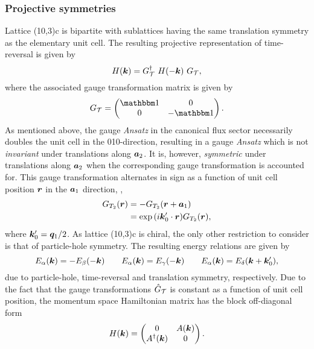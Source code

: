 %
%
\subsubsection{Projective symmetries}
%
%
Lattice (10,3)c is bipartite with sublattices having the same translation symmetry as the elementary unit cell.
The resulting projective representation of time-reversal is given by
%
\begin{equation}
	H(\bm{k}) = G^{\dagger}_{\mathcal{T}}~H(-\bm{k})~G_{\mathcal{T}},
\end{equation}
%
where the associated gauge transformation matrix is given by
%
\begin{equation}
	G_{\mathcal{T}} =
		\begin{pmatrix}
			\id & 0 \\
			0	& -\id
		\end{pmatrix}.
\end{equation}
%
As mentioned above, the gauge \textit{Ansatz} in the canonical flux sector necessarily doubles the unit cell in the 010-direction, resulting in a gauge \textit{Ansatz} which is not \textit{invariant} under translations along $\bm{a}_2$.
It is, however, \textit{symmetric} under translations along $\bm{a}_2$ when the corresponding gauge transformation is accounted for.
This gauge transformation alternates in sign as a function of unit cell position $\bm{r}$ in the $\bm{a}_1$ direction, \ie,
\begin{align}
	G_{T_2}(\bm{r}) &= -G_{T_2}(\bm{r} + \bm{a}_1) \nonumber\\
				 &= \exp{(i \bm{k}'_0 \cdot \bm{r})} G_{T_2}(\bm{r}),
\end{align}
where $\bm{k}'_0 = \bm{q}_1 / 2$.
As lattice (10,3)c is chiral, the only other restriction to consider is that of particle-hole symmetry.
The resulting energy relations are given by
%
\begin{equation}
	E_{\alpha}(\bm{k}) = - E_{\beta}(-\bm{k}) \qquad E_{\alpha}(\bm{k}) = E_{\gamma}(-\bm{k}) \qquad E_{\alpha}(\bm{k}) = E_{\delta}(\bm{k} + \bm{k}'_0),
\end{equation}
%
due to particle-hole, time-reversal and translation symmetry, respectively.
Due to the fact that the gauge transformations $\hat{G}_{\mathcal{T}}$ is constant as a function of unit cell position, the momentum space Hamiltonian matrix has the block off-diagonal form
%
\begin{equation}
	H(\bm{k}) =
		\begin{pmatrix}
			0			& A(\bm{k}) \\
			A^{\dagger}(\bm{k})	& 0
		\end{pmatrix}.
\end{equation}
%


